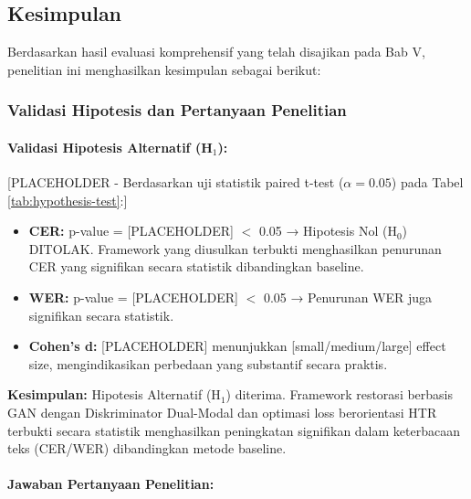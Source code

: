 \documentclass[12pt,a4paper]{article}
\begin{document}
\subsection{Kesimpulan}
\label{subsec:kesimpulan}
\vspace{0.8em}

Berdasarkan hasil evaluasi komprehensif yang telah disajikan pada Bab V, penelitian ini menghasilkan kesimpulan sebagai berikut:

\subsubsection{Validasi Hipotesis dan Pertanyaan Penelitian}

\paragraph{Validasi Hipotesis Alternatif (H$_1$):}

[PLACEHOLDER - Berdasarkan uji statistik paired t-test ($\alpha = 0.05$) pada Tabel \ref{tab:hypothesis-test}:]

\begin{itemize}[leftmargin=*, nosep]
    \item \textbf{CER:} p-value = [PLACEHOLDER] $<$ 0.05 → Hipotesis Nol (H$_0$) DITOLAK. Framework yang diusulkan terbukti menghasilkan penurunan CER yang signifikan secara statistik dibandingkan baseline.
    
    \item \textbf{WER:} p-value = [PLACEHOLDER] $<$ 0.05 → Penurunan WER juga signifikan secara statistik.
    
    \item \textbf{Cohen's d:} [PLACEHOLDER] menunjukkan [small/medium/large] effect size, mengindikasikan perbedaan yang substantif secara praktis.
\end{itemize}

\textbf{Kesimpulan:} Hipotesis Alternatif (H$_1$) diterima. Framework restorasi berbasis GAN dengan Diskriminator Dual-Modal dan optimasi loss berorientasi HTR terbukti secara statistik menghasilkan peningkatan signifikan dalam keterbacaan teks (CER/WER) dibandingkan metode baseline.

\paragraph{Jawaban Pertanyaan Penelitian:}
\end{document}

